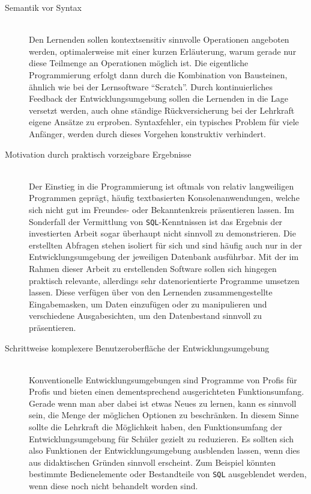 \begin{description}
\item[Semantik vor Syntax] \hfill\\
  Den Lernenden sollen kontextsensitiv sinnvolle Operationen angeboten werden, optimalerweise mit einer kurzen Erläuterung, warum gerade nur diese Teilmenge an Operationen möglich ist. Die eigentliche Programmierung erfolgt dann durch die Kombination von Bausteinen, ähnlich wie bei der Lernsoftware "`Scratch"'. Durch kontinuierliches Feedback der Entwicklungsumgebung sollen die Lernenden in die Lage versetzt werden, auch ohne ständige Rückversicherung bei der Lehrkraft eigene Ansätze zu erproben. Syntaxfehler, ein typisches Problem für viele Anfänger, werden durch dieses Vorgehen konstruktiv verhindert.
\item[Motivation durch praktisch vorzeigbare Ergebnisse] \hfill\\
  Der Einstieg in die Programmierung ist oftmals von relativ langweiligen Programmen geprägt, häufig textbasierten Konsolenanwendungen, welche sich nicht gut im Freundes- oder Bekanntenkreis präsentieren lassen. Im Sonderfall der Vermittlung von \texttt{SQL}-Kenntnissen ist das Ergebnis der investierten Arbeit sogar überhaupt nicht sinnvoll zu demonstrieren. Die erstellten Abfragen stehen isoliert für sich und sind häufig auch nur in der Entwicklungsumgebung der jeweiligen Datenbank ausführbar. Mit der im Rahmen dieser Arbeit zu erstellenden Software sollen sich hingegen praktisch relevante, allerdings sehr datenorientierte Programme umsetzen lassen. Diese verfügen über von den Lernenden zusammengestellte Eingabemasken, um Daten einzufügen oder zu manipulieren und verschiedene Ausgabesichten, um den Datenbestand sinnvoll zu präsentieren.
\item[Schrittweise komplexere Benutzeroberfläche der Entwicklungsumgebung] \hfill \\
  Konventionelle Entwicklungsumgebungen sind Programme von Profis für Profis und bieten einen dementsprechend ausgerichteten Funktionsumfang. Gerade wenn man aber dabei ist etwas Neues zu lernen, kann es sinnvoll sein, die Menge der möglichen Optionen zu beschränken. In diesem Sinne sollte die Lehrkraft die Möglichkeit haben, den Funktionsumfang der Entwicklungsumgebung für Schüler gezielt zu reduzieren. Es sollten sich also Funktionen der Entwicklungsumgebung ausblenden lassen, wenn dies aus didaktischen Gründen sinnvoll erscheint. Zum Beispiel könnten bestimmte Bedienelemente oder Bestandteile von \texttt{SQL} ausgeblendet werden, wenn diese noch nicht behandelt worden sind.

\end{description}
